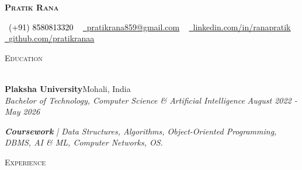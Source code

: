 \documentclass[letterpaper, 10.5t]{article}
\newcommand{\sectionSep} { \vspace{2.5mm} }
\newcommand{\lineunder} {
    \vspace*{-8pt} \\
    \hspace*{-15pt} \hrulefill \\
}
\newcommand{\header} [1] {
    {\hspace*{-18pt}\vspace*{6pt} {
        \fontfamily{qcs}\selectfont \large \scshape #1
    }}
    \vspace*{-6pt} \lineunder
    \vspace{1.1mm}
}
\newcommand{\educationItem}[6]{
    \textbf{#1}\hfill #2\\
    \textit{#3} \textit{#4} \hfill \textit{#5}\\
    #6
}
\begin{document}

\begin{center}
    {\textbf{\Huge \scshape Pratik Rana}} \\ \vspace{1pt}
    
    \small \textcolor{black}{\raisebox{-0.1\height}\faPhone\
        (+91) 8580813320} ~ \href{mailto:pratikrana859@gmail.com}{{\raisebox{-0.2\height}\faEnvelope\  \underline{pratikrana859@gmail.com}}} ~
    \href{https://www.linkedin.com/in/ranapratik/}{{\raisebox{-0.2\height}\faLinkedinSquare\ \underline{linkedin.com/in/ranapratik}}}  ~
    \href{https://github.com/pratikranaa}{{\raisebox{-0.2\height}\faGithub\ \underline{github.com/pratikranaa}}} 
\end{center}

\vspace{-2mm}

\hypersetup {
    urlcolor     = blue, %
}


\header{Education}

\educationItem{Plaksha University}{Mohali, India}{Bachelor of Technology, Computer Science \& Artificial Intelligence}{}{August 2022 - May 2026}{
    \vspace{0.7mm}

    \textit{\textbf{Coursework} | Data Structures, Algorithms, Object-Oriented Programming, DBMS, AI \& ML, Computer Networks, OS.}
}

\sectionSep


\header{Experience}
\end{document}

